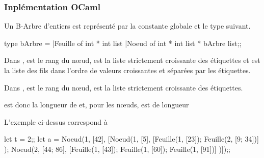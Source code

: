 \subsubsection{Inplémentation OCaml}
Un B-Arbre d’entiers est représenté par la constante globale   et le type suivant.
\begin{ocaml}
type bArbre = |Feuille of int * int list
              |Noeud of int * int list * bArbre list;;
\end{ocaml}
Dans ,  est le rang du nœud,  est la liste strictement croissante  des étiquettes et  est la liste des fils dans l'ordre de valeurs croissantes et séparées par les étiquettes. 

Dans ,  est le rang du nœud,  est la liste strictement croissante  des étiquettes.

 est donc la longueur de  et, pour les nœuds,  est de longueur 

L'exemple ci-dessus correspond à
\begin{ocaml}
let t = 2;;
let a = Noeud(1, 
              [42],
              [Noeud(1, 
                     [5],
                     [Feuille(1, [23]); Feuille(2, [9; 34])]
                    );
               Noeud(2,
                     [44; 86],
                     [Feuille(1, [43]);
                      Feuille(1, [60]);
                      Feuille(1, [91])]
                     )]);;
\end{ocaml}
